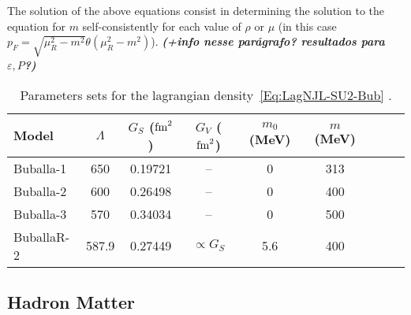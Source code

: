 \documentclass[prc, reprint, amsmath, linenumbers,10pt]{revtex4-1}
\newcommand{\comment}[1]{{\bf\textit{#1}}}
\begin{document}
The solution of the above equations consist in determining the solution to the equation for $m$ self-consistently for each value of $\rho$ or $\mu$ (in this case $p_F = \sqrt{\mu_R^2 - m^2}\theta(\mu_R^2 - m^2)$). \comment{(+info nesse parágrafo? resultados para $\varepsilon, P$?)}

\begin{table*}
\caption{Parameters sets for the lagrangian density~\eqref{Eq:LagNJL-SU2-Bub} \cite{Buballa1996, Buballa2005}. \label{Tab:Parametros_NJL}}
\begin{ruledtabular}
\begin{tabular}{lcccccccc}
Model &  $\Lambda$ & $G_S$ ($\rm{fm}^2$) & $G_V$ ($\rm{fm}^2$) & $m_0$ (MeV) & $m$ (MeV) \\
\hline
Buballa-1 & 650 & 0.19721 & -- & 0 & 313 \\
Buballa-2 & 600 & 0.26498 & -- & 0 & 400 \\
Buballa-3 & 570 & 0.34034 & -- & 0 & 500 \\
BuballaR-2 & 587.9 & 0.27449 & $\propto G_S$ & 5.6 & 400 \\
\end{tabular}
\end{ruledtabular}
\end{table*}

\subsection{Hadron Matter}
\end{document}
